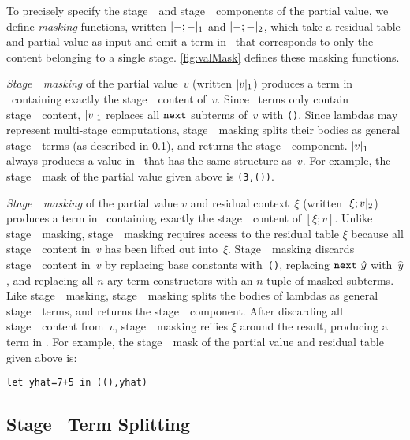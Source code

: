 To precisely specify the stage~\bbone\ and stage~\bbtwo\ components of the partial value, we define 
\emph{masking} functions, written $|{-};{-}|_{ 1}$ and $|{-};{-}|_{ 2}$, 
which take a residual table and partial value as input and emit a term in \langmono\
that corresponds to only the content belonging to a single stage. \ref{fig:valMask} defines these
masking functions.

\emph{Stage~\bbone\ masking} of the partial value~$v$ (written $|v|_{ 1}$) produces a term in \langmono\ containing exactly
the stage~\bbone\ content of~$v$. Since \next\ terms only contain stage~\bbtwo\
content, $|v|_{ 1}$ replaces all ${\tt next}$ subterms of~$v$ with \texttt{()}.  Since lambdas may represent multi-stage computations, stage~\bbone\ masking splits their bodies as general stage~\bbone\ terms (as described in \ref{sec:split-one}), and returns
the stage~\bbone\ component. $|v|_{ 1}$ always produces a value in \langmono\ that has
the same structure as~$v$.  For example, the stage~\bbone\ mask of the partial value given above is \texttt{(3,())}. 

\emph{Stage~\bbtwo\ masking} of the partial value $v$ and residual context~$\xi$ (written $|\xi;v|_{ 2}$) produces a term in \langmono\ containing
exactly the stage~\bbtwo\ content of $[\xi;v]$. Unlike stage~\bbone\ masking, stage~\bbtwo\ masking 
requires access to the residual table $\xi$ because all stage~\bbtwo\
content in~$v$ has been lifted out into~$\xi$. Stage~\bbtwo\ masking discards
stage~\bbone\ content in~$v$ by replacing base constants with~\texttt{()},
replacing ${\tt next}~\hat{y}$ with~$\hat{y}$, and replacing all $n$-ary term
constructors with an $n$-tuple of masked subterms. Like stage~\bbone\ masking, stage~\bbtwo\
masking splits the bodies of lambdas as general stage~\bbone\ terms, and
returns the stage~\bbtwo\ component. After discarding all stage~\bbone\ content from~$v$, stage~\bbtwo\ masking reifies $\xi$ around the result,
producing a term in \langmono. For example, the stage~\bbtwo\ mask of the partial value and residual table given above is:
\begin{lstlisting}
let yhat=7+5 in ((),yhat)
\end{lstlisting}

\subsection{Stage \bbone\ Term Splitting}
\label{sec:split-one}

